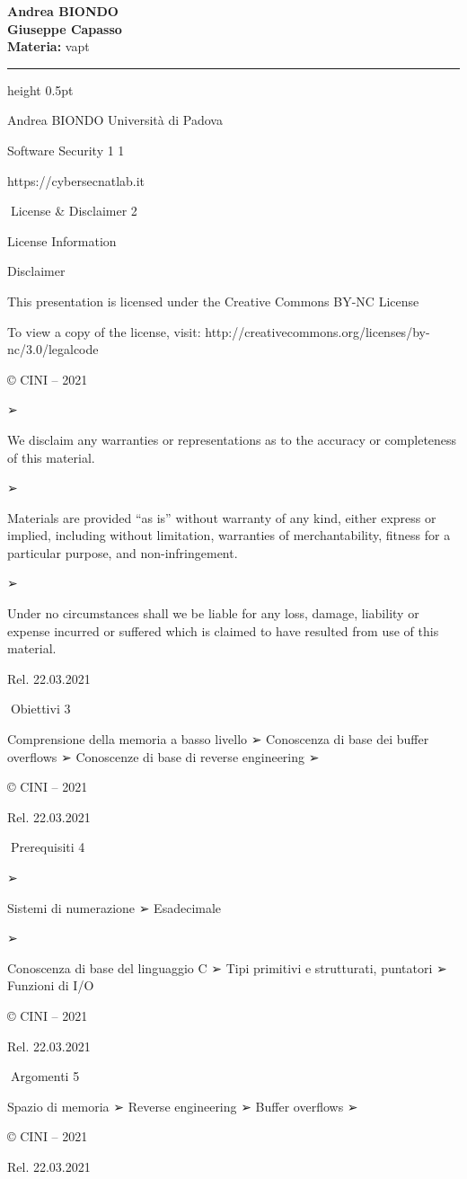 \documentclass[11pt,a4paper]{article}
\newcommand{\proposaltitle}[1]{
    \begin{center}
        \vspace*{0.1cm}
        {\LARGE \bfseries \color{blue} #1} \\[1.5ex]
        {\large \textbf{Giuseppe Capasso}} \\[1ex]
                \small{
            \vspace{0.1cm}
            \textbf{Materia:} vapt\\
        }
            \end{center}
    \vspace{0.3cm}
    \hrule height 0.5pt
    \vspace{0.5cm}
}
\begin{document}
\proposaltitle{Andrea BIONDO}

Andrea BIONDO Università di Padova

Software Security 1 1

https://cybersecnatlab.it

License \& Disclaimer 2

License Information

Disclaimer

This presentation is licensed under the Creative Commons BY-NC License

To view a copy of the license, visit:
http://creativecommons.org/licenses/by-nc/3.0/legalcode

© CINI -- 2021

➢

We disclaim any warranties or representations as to the accuracy or
completeness of this material.

➢

Materials are provided ``as is'' without warranty of any kind, either
express or implied, including without limitation, warranties of
merchantability, fitness for a particular purpose, and non-infringement.

➢

Under no circumstances shall we be liable for any loss, damage,
liability or expense incurred or suffered which is claimed to have
resulted from use of this material.

Rel. 22.03.2021

Obiettivi 3

Comprensione della memoria a basso livello ➢ Conoscenza di base dei
buffer overflows ➢ Conoscenze di base di reverse engineering ➢

© CINI -- 2021

Rel. 22.03.2021

Prerequisiti 4

➢

Sistemi di numerazione ➢ Esadecimale

➢

Conoscenza di base del linguaggio C ➢ Tipi primitivi e strutturati,
puntatori ➢ Funzioni di I/O

© CINI -- 2021

Rel. 22.03.2021

Argomenti 5

Spazio di memoria ➢ Reverse engineering ➢ Buffer overflows ➢

© CINI -- 2021

Rel. 22.03.2021
\end{document}
